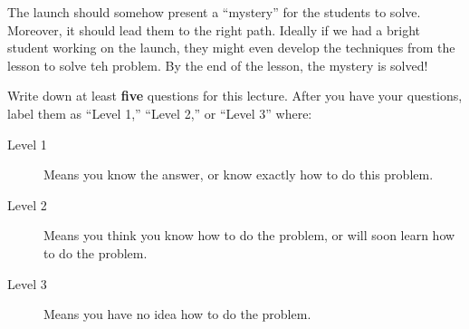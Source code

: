 

The launch should somehow present a ``mystery'' for the students to
solve.  Moreover, it should lead them to the right path. Ideally if we
had a bright student working on the launch, they might even develop
the techniques from the lesson to solve teh problem. 
By the end of the lesson, the mystery is solved!




\begin{question}
Write down at least \textbf{five} questions for this lecture. After
you have your questions, label them as ``Level 1,'' ``Level 2,'' or ``Level 3'' where:
\begin{description}
\item[Level 1] Means you know the answer, or know exactly how to do this problem.
\item[Level 2] Means you think you know how to do the problem, or will soon learn how to do the problem.
\item[Level 3] Means you have no idea how to do the problem. 
\end{description}
  \begin{freeResponse}
  \end{freeResponse}
\end{question}


